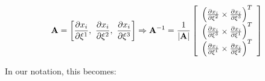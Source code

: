 \[{\bf{A}} = \left[ {\frac{{\partial {x_i}}}{{\partial {\xi ^1}}},\,\,\frac{{\partial {x_i}}}{{\partial {\xi ^2}}},\,\,\frac{{\partial {x_i}}}{{\partial {\xi ^3}}}} \right] \Rightarrow {{\bf{A}}^{ - 1}} = \frac{1}{{\left| {\bf{A}} \right|}}\left[ {\begin{array}{*{20}{c}}
{{{\left( {\frac{{\partial {x_i}}}{{\partial {\xi ^2}}} \times \frac{{\partial {x_i}}}{{\partial {\xi ^3}}}} \right)}^T}}\\
{{{\left( {\frac{{\partial {x_i}}}{{\partial {\xi ^3}}} \times \frac{{\partial {x_i}}}{{\partial {\xi ^1}}}} \right)}^T}}\\
{{{\left( {\frac{{\partial {x_i}}}{{\partial {\xi ^1}}} \times \frac{{\partial {x_i}}}{{\partial {\xi ^2}}}} \right)}^T}}
\end{array}} \right]\]

In our notation, this becomes:

